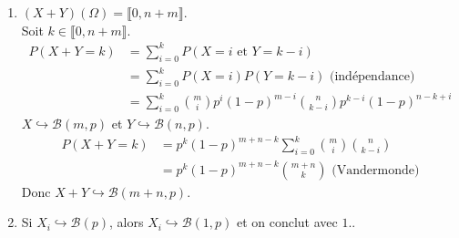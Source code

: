 \documentclass[../main.tex]{subfiles}
\begin{document}
\begin{enumerate}
    \item $(X + Y)(\Omega) = \llbracket 0, n + m \rrbracket$. \\
    Soit $k\in \llbracket 0, n + m \rrbracket$.
    \begin{align*}
        P(X + Y = k) &= \sum_{i=0}^{k} P(X = i \text{ et } Y = k - i) \\
        &= \sum_{i=0}^{k} P(X = i) P(Y = k - i) \text{ (indépendance)} \\
        &= \sum_{i=0}^{k} \binom{m}{i} p^i (1-p)^{m-i} \binom{n}{k-i} p^{k-i} (1-p)^{n-k+i}
    \end{align*}
    $X\hookrightarrow \mathcal{B}(m, p)$ et $Y\hookrightarrow \mathcal{B}(n, p)$. 
    \begin{align*}
        P(X + Y = k) &= p^k (1-p)^{m+n-k} \sum_{i=0}^{k} \binom{m}{i} \binom{n}{k-i} \\
        &= p^k (1-p)^{m+n-k} \binom{m+n}{k} \text{ (Vandermonde)}
    \end{align*}
    Donc $X + Y \hookrightarrow \mathcal{B}(m+n, p)$.

    \item Si $X_i \hookrightarrow \mathcal{B}(p)$, alors $X_i\hookrightarrow \mathcal{B}(1, p)$ et on conclut avec $\boxed{1.}$. 
\end{enumerate}
\end{document}
